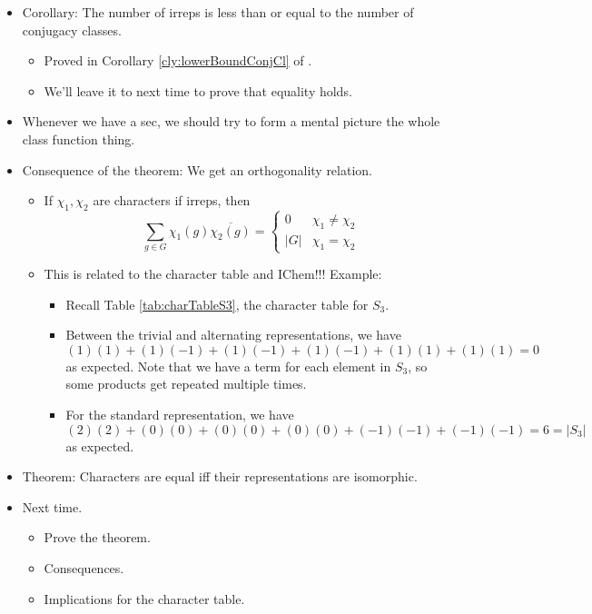 \documentclass[../notes.tex]{subfiles}
\begin{document}
\begin{itemize}
\begin{itemize}
    \end{itemize}
    \item Corollary: The number of irreps is less than or equal to the number of conjugacy classes.
    \begin{itemize}
        \item Proved in Corollary \ref{cly:lowerBoundConjCl} of \textcite{bib:FultonHarris}.
        \item We'll leave it to next time to prove that equality holds.
    \end{itemize}
    \item Whenever we have a sec, we should try to form a mental picture the whole class function thing.
    \item Consequence of the theorem: We get an orthogonality relation.
    \begin{itemize}
        \item If $\chi_1,\chi_2$ are characters if irreps, then
        \begin{equation*}
            \sum_{g\in G}\chi_1(g)\overline{\chi_2(g)} =
            \begin{cases}
                0 & \chi_1\neq\chi_2\\
                |G| & \chi_1=\chi_2
            \end{cases}
        \end{equation*}
        \item This is related to the character table and IChem!!! Example:
        \begin{itemize}
            \item Recall Table \ref{tab:charTableS3}, the character table for $S_3$.
            \item Between the trivial and alternating representations, we have
            \begin{equation*}
                (1)(1)+(1)(-1)+(1)(-1)+(1)(-1)+(1)(1)+(1)(1) = 0
            \end{equation*}
            as expected. Note that we have a term for each element in $S_3$, so some products get repeated multiple times.
            \item For the standard representation, we have
            \begin{equation*}
                (2)(2)+(0)(0)+(0)(0)+(0)(0)+(-1)(-1)+(-1)(-1) = 6 = |S_3|
            \end{equation*}
            as expected.
        \end{itemize}
    \end{itemize}
    \item Theorem: Characters are equal iff their representations are isomorphic.
    \item Next time.
    \begin{itemize}
        \item Prove the theorem.
        \item Consequences.
        \item Implications for the character table.
    \end{itemize}
\end{itemize}
\end{document}
